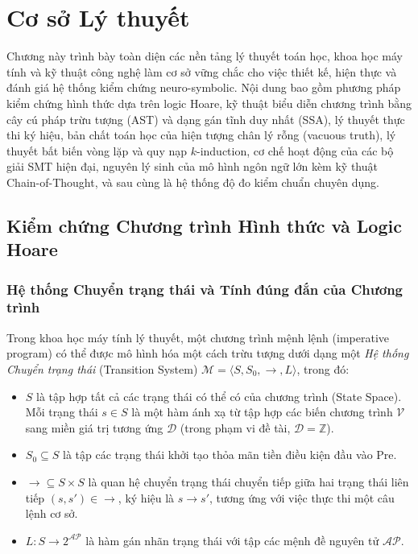 \chapter{Cơ sở Lý thuyết}
\label{ch:background}

Chương này trình bày toàn diện các nền tảng lý thuyết toán học, khoa học máy tính và kỹ thuật công nghệ làm cơ sở vững chắc cho việc thiết kế, hiện thực và đánh giá hệ thống kiểm chứng neuro-symbolic. Nội dung bao gồm phương pháp kiểm chứng hình thức dựa trên logic Hoare, kỹ thuật biểu diễn chương trình bằng cây cú pháp trừu tượng (AST) và dạng gán tĩnh duy nhất (SSA), lý thuyết thực thi ký hiệu, bản chất toán học của hiện tượng chân lý rỗng (vacuous truth), lý thuyết bất biến vòng lặp và quy nạp $k$-induction, cơ chế hoạt động của các bộ giải SMT hiện đại, nguyên lý sinh của mô hình ngôn ngữ lớn kèm kỹ thuật Chain-of-Thought, và sau cùng là hệ thống độ đo kiểm chuẩn chuyên dụng.

\section{Kiểm chứng Chương trình Hình thức và Logic Hoare}
\label{sec:formal_verification_hoare}

\subsection{Hệ thống Chuyển trạng thái và Tính đúng đắn của Chương trình}
Trong khoa học máy tính lý thuyết, một chương trình mệnh lệnh (imperative program) có thể được mô hình hóa một cách trừu tượng dưới dạng một \textit{Hệ thống Chuyển trạng thái} (Transition System) $\mathcal{M} = \langle S, S_0, \rightarrow, L \rangle$, trong đó:
\begin{itemize}
    \item $S$ là tập hợp tất cả các trạng thái có thể có của chương trình (State Space). Mỗi trạng thái $s \in S$ là một hàm ánh xạ từ tập hợp các biến chương trình $\mathcal{V}$ sang miền giá trị tương ứng $\mathcal{D}$ (trong phạm vi đề tài, $\mathcal{D} = \mathbb{Z}$).
    \item $S_0 \subseteq S$ là tập các trạng thái khởi tạo thỏa mãn tiền điều kiện đầu vào $\text{Pre}$.
    \item $\rightarrow \subseteq S \times S$ là quan hệ chuyển trạng thái chuyển tiếp giữa hai trạng thái liên tiếp $(s, s') \in \rightarrow$, ký hiệu là $s \rightarrow s'$, tương ứng với việc thực thi một câu lệnh cơ sở.
    \item $L: S \rightarrow 2^{\mathcal{AP}}$ là hàm gán nhãn trạng thái với tập các mệnh đề nguyên tử $\mathcal{AP}$.
\end{itemize}

